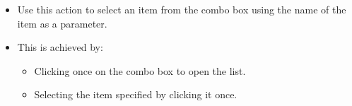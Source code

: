 \begin{itemize}
\item Use this action to select an item from the combo box using the name of the item as a parameter.
\item This is achieved by:
\begin{itemize} 
\item Clicking once on the combo box to open the list.
\item Selecting the item specified by clicking it once.
\end{itemize}
\end{itemize}


